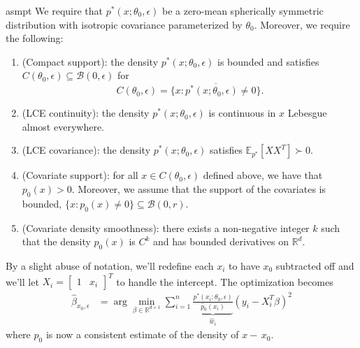 \documentclass[11pt]{article}
\begin{document}
\begin{restatable}{asmpt}{} \label{assumption: lce and covariate density}
    We require that $p^*(x; \theta_0, \epsilon)$ be a zero-mean spherically symmetric distribution with isotropic covariance parameterized by $\theta_0$. Moreover, we require the following: 
    \begin{enumerate}
        \item (Compact support): the density $p^*(x; \theta_0, \epsilon)$ is bounded and satisfies $C(\theta_0, \epsilon) \subseteq \mathcal{B}(0, \epsilon)$ for \begin{equation} \label{eq: support}
             C(\theta_0, \epsilon) = \overline{\{x : p^*(x; \theta_0, \epsilon) \neq 0\}}.
        \end{equation}
        \item (LCE continuity): the density $p^*(x; \theta_0, \epsilon)$ is continuous in $x$ Lebesgue almost everywhere.
        \item (LCE covariance): the density $p^*(x; \theta_0, \epsilon)$ satisfies $\mathbb{E}_{p^*}[XX^T] \succ 0$. 
        \item (Covariate support): for all $x \in C(\theta_0, \epsilon)$ defined above, we have that $p_0(x) > 0$. Moreover, we assume that the support of the covariates is bounded, $\{x : p_0(x) \neq 0\} \subseteq \mathcal{B}(0, r). $
        \item (Covariate density smoothness): 
        there exists a non-negative integer $k$ such that the density $p_0(x)$ is $C^k$ and has bounded derivatives on $\mathbb{R}^d$.
    \end{enumerate} 
\end{restatable}
\noindent By a slight abuse of notation, we'll redefine each $x_i$ to have $x_0$ subtracted off and we'll let $X_i = \begin{bmatrix}
    1 & x_i
\end{bmatrix}^T$ to handle the intercept. The optimization becomes 
\begin{align} 
\widehat{\beta}_{x_0,\epsilon} &= \arg\min_{\beta \in \mathbb{R}^{d+1}} \sum_{i = 1}^{n}\underbrace{\frac{p^*(x_i;\theta_0, \epsilon)}{\hat{p}_0(x_i)}}_{\hat{w}_i}\left(y_i - X_i^{T}\beta\right)^2
\end{align}
where $\hat{p}_0$ is now a consistent estimate of the density of $x - \,x_0$. 
\end{document}
